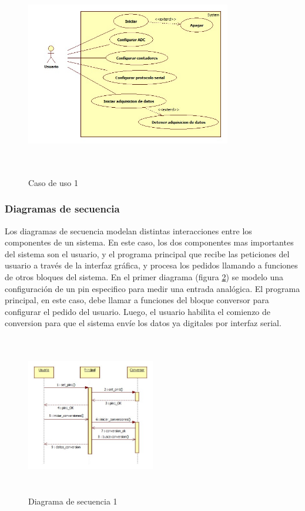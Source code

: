 \documentclass{article}
\theoremstyle{definition}
\theoremstyle{remark}
\begin{document}
\begin{figure}[h]
  \centering
  \includegraphics[width=0.80\textwidth, height = 9cm]{CasoUso1}
  \caption{\small Caso de uso 1}\label{fig:casouso1}
\end{figure}


\subsubsection{Diagramas de secuencia} %
\label{ssub:diagramas_de_secuencia}

Los diagramas de secuencia modelan distintas interacciones entre los componentes de un sistema. En este caso, los dos componentes mas importantes del sistema son el usuario, y el programa principal que recibe las peticiones del usuario a través de la interfaz gráfica, y procesa los pedidos llamando a funciones de otros bloques del sistema. En el primer diagrama (figura \ref{fig:secuencia1}) se modelo una configuración de un pin especifico para medir una entrada analógica. El programa principal, en este caso, debe llamar a funciones del bloque conversor para configurar el pedido del usuario. Luego, el usuario habilita el comienzo de conversion para que el sistema envíe los datos ya digitales por interfaz serial.

\begin{figure}[h]
  \centering
  \includegraphics[width=0.50\textwidth, height = 7cm]{Secuencia1}
  \caption{\small Diagrama de secuencia 1}\label{fig:secuencia1}
\end{figure}
\end{document}
